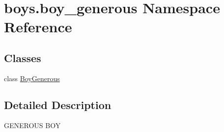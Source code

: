 \hypertarget{namespaceboys_1_1boy__generous}{}\section{boys.\+boy\+\_\+generous Namespace Reference}
\label{namespaceboys_1_1boy__generous}
\subsection*{Classes}
\begin{DoxyCompactItemize}
\item 
class \hyperlink{classboys_1_1boy__generous_1_1_boy_generous}{Boy\+Generous}
\end{DoxyCompactItemize}


\subsection{Detailed Description}
\begin{DoxyVerb}GENEROUS BOY\end{DoxyVerb}
 